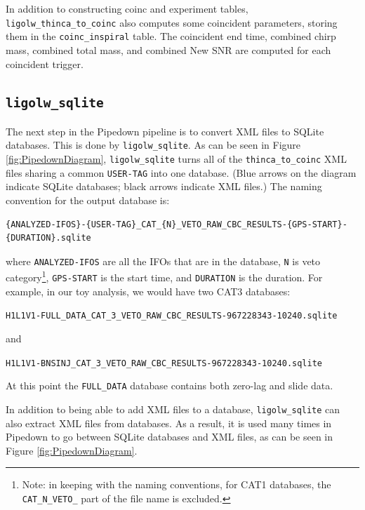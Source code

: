 In addition to constructing coinc and experiment tables,
\texttt{ligolw\_thinca\_to\_coinc} also computes some coincident parameters,
storing them in the \texttt{coinc\_inspiral} table. The coincident end time,
combined chirp mass, combined total mass, and combined New \ac{SNR} are
computed for each coincident trigger.

\subsection{\texttt{ligolw\_sqlite}}
\label{sec:ligolw_sqlite}

The next step in the Pipedown pipeline is to convert XML files to SQLite
databases. This is done by \texttt{ligolw\_sqlite}. As can be seen in Figure
\ref{fig:PipedownDiagram}, \texttt{ligolw\_sqlite} turns all of the
\texttt{thinca\_to\_coinc} XML files sharing a common \texttt{USER-TAG} into
one database. (Blue arrows on the diagram indicate SQLite databases; black
arrows indicate XML files.) The naming convention for the output database is:
\begin{center}
\begin{footnotesize}
\begin{verbatim}
{ANALYZED-IFOS}-{USER-TAG}_CAT_{N}_VETO_RAW_CBC_RESULTS-{GPS-START}-{DURATION}.sqlite
\end{verbatim}
\end{footnotesize}
\end{center}
where \texttt{ANALYZED-IFOS} are all the \acp{IFO} that are in the database,
\texttt{N} is veto category\footnote{Note: in keeping with the \hipe naming
conventions, for CAT1 databases, the \texttt{CAT\_N\_VETO\_} part of the file
name is excluded.}, \texttt{GPS-START} is the \ihope start time, and
\texttt{DURATION} is the \ihope duration. For example, in our toy analysis, we
would have two CAT3 databases:
\begin{center}
\verb|H1L1V1-FULL_DATA_CAT_3_VETO_RAW_CBC_RESULTS-967228343-10240.sqlite|
\end{center}
and
\begin{center}
\verb|H1L1V1-BNSINJ_CAT_3_VETO_RAW_CBC_RESULTS-967228343-10240.sqlite|
\end{center}
At this point the \texttt{FULL\_DATA} database contains both zero-lag and slide data.

In addition to being able to add XML files to a database,
\texttt{ligolw\_sqlite} can also extract XML files from databases. As a result,
it is used many times in Pipedown to go between SQLite databases and XML files,
as can be seen in Figure \ref{fig:PipedownDiagram}.

